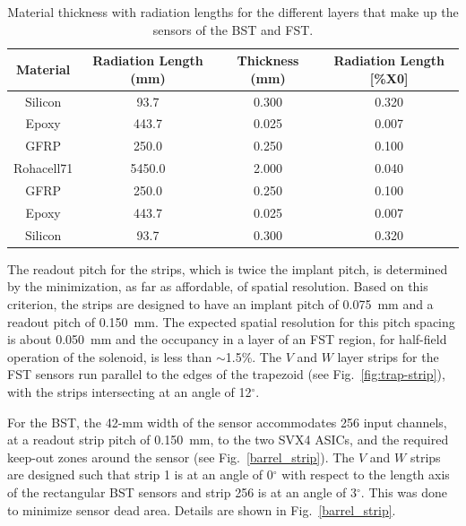\begin{table}[htbp]
\begin{center}
\begin{tabular}{|c|c|c|c|} \hline
Material & Radiation Length (mm) & Thickness (mm) & Radiation Length [\%X0] 
\\ \hline
Silicon    &   93.7 & 0.300 & 0.320 \\ \hline
Epoxy      &  443.7 & 0.025 & 0.007 \\ \hline
GFRP       &  250.0 & 0.250 & 0.100 \\ \hline
Rohacell71 & 5450.0 & 2.000 & 0.040 \\ \hline
GFRP       &  250.0 & 0.250 & 0.100 \\ \hline
Epoxy      &  443.7 & 0.025 & 0.007 \\ \hline
Silicon    &   93.7 & 0.300 & 0.320 \\ \hline 
\end{tabular}
\end{center}
\caption{\small{Material thickness with radiation lengths for the different
layers that make up the sensors of the BST and FST.}}
\label{matprop}
\end{table}

The readout pitch for the strips, which is twice the implant pitch, is 
determined by the minimization, as far as affordable, of spatial resolution.  
Based on this criterion, the strips are designed to have an implant pitch of 
0.075~mm and a readout pitch of 0.150~mm.  The expected spatial resolution 
for this pitch spacing is about 0.050~mm and the occupancy in a layer of an 
FST region, for half-field operation of the solenoid, is less than $\sim$1.5\%.
The $V$ and $W$ layer strips for the FST sensors run parallel to the edges of 
the trapezoid (see Fig.~\ref{fig:trap-strip}), with the strips intersecting at 
an angle of 12$^\circ$.

For the BST, the 42-mm width of the sensor accommodates 256 input 
channels, at a readout strip pitch of 0.150~mm, to the two SVX4 ASICs, and 
the required keep-out zones around the sensor (see Fig.~\ref{barrel_strip}).  
The $V$ and $W$ strips are designed such that strip 1 is at an 
angle of 0$^\circ$ with respect to the length axis of the rectangular BST 
sensors and strip 256 is at an angle of 3$^\circ$.  This was done to minimize
sensor dead area.  Details are shown in Fig.~\ref{barrel_strip}.  

